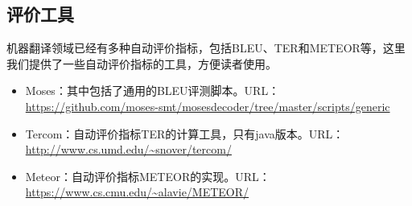 \begin{appendices}

\subsection{评价工具}
\parinterval 机器翻译领域已经有多种自动评价指标，包括BLEU、TER和METEOR等，这里我们提供了一些自动评价指标的工具，方便读者使用。
\vspace{0.5em}
\begin{itemize}
\item Moses：其中包括了通用的BLEU评测脚本。URL：\url{https://github.com/moses-smt/mosesdecoder/tree/master/scripts/generic}
\vspace{0.5em}
\item Tercom：自动评价指标TER的计算工具，只有java版本。URL：\url{http://www.cs.umd.edu/~snover/tercom/}
\vspace{0.5em}
\item Meteor：自动评价指标METEOR的实现。URL：\url{https://www.cs.cmu.edu/~alavie/METEOR/}
\end{itemize}

\end{appendices}



